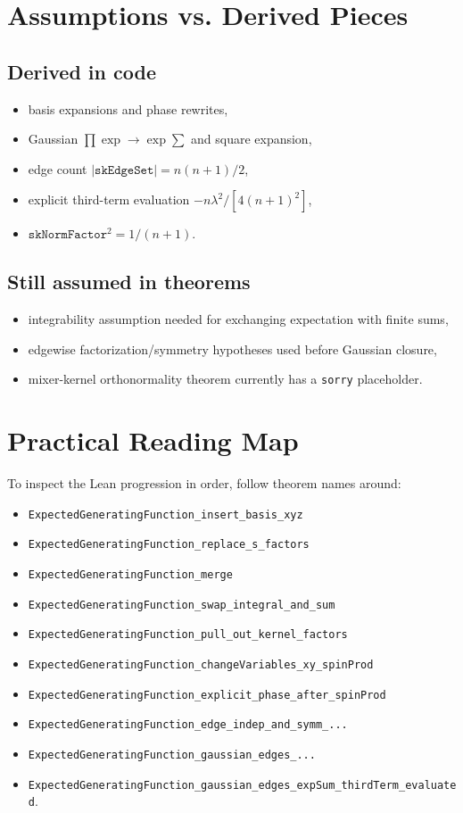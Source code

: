 \documentclass[11pt]{article}
\begin{document}
\section{Assumptions vs. Derived Pieces}
\subsection*{Derived in code}
\begin{itemize}
  \item basis expansions and phase rewrites,
  \item Gaussian \(\prod\exp\to\exp\sum\) and square expansion,
  \item edge count \(|\texttt{skEdgeSet}|=n(n+1)/2\),
  \item explicit third-term evaluation \(-n\lambda^2/[4(n+1)^2]\),
  \item \(\texttt{skNormFactor}^2=1/(n+1)\).
\end{itemize}

\subsection*{Still assumed in theorems}
\begin{itemize}
  \item integrability assumption needed for exchanging expectation with finite sums,
  \item edgewise factorization/symmetry hypotheses used before Gaussian closure,
  \item mixer-kernel orthonormality theorem currently has a \texttt{sorry} placeholder.
\end{itemize}

\section{Practical Reading Map}
To inspect the Lean progression in order, follow theorem names around:
\begin{itemize}
  \item \texttt{ExpectedGeneratingFunction\_insert\_basis\_xyz}
  \item \texttt{ExpectedGeneratingFunction\_replace\_s\_factors}
  \item \texttt{ExpectedGeneratingFunction\_merge}
  \item \texttt{ExpectedGeneratingFunction\_swap\_integral\_and\_sum}
  \item \texttt{ExpectedGeneratingFunction\_pull\_out\_kernel\_factors}
  \item \texttt{ExpectedGeneratingFunction\_changeVariables\_xy\_spinProd}
  \item \texttt{ExpectedGeneratingFunction\_explicit\_phase\_after\_spinProd}
  \item \texttt{ExpectedGeneratingFunction\_edge\_indep\_and\_symm\_...}
  \item \texttt{ExpectedGeneratingFunction\_gaussian\_edges\_...}
  \item \texttt{ExpectedGeneratingFunction\_gaussian\_edges\_expSum\_thirdTerm\_evaluated}.
\end{itemize}
\end{document}
